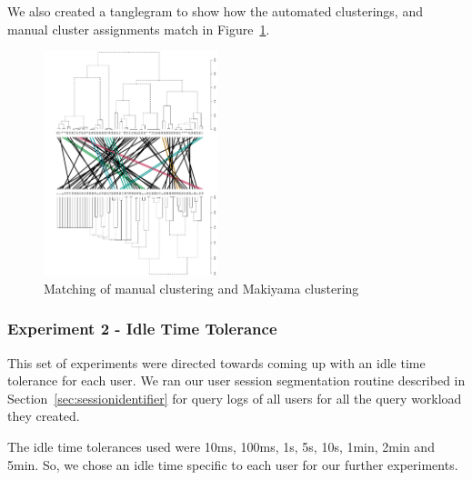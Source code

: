 
We also created a tanglegram to show how the automated clusterings, and manual cluster assignments match in Figure~\ref{fig:tanglegram}.

\begin{figure}[h!]
    \centering
    \includegraphics[width=0.45\textwidth]{graphics/tanglegram}
    \caption{Matching of manual clustering and Makiyama clustering }
    \label{fig:tanglegram}
\end{figure}

\subsubsection{Experiment 2 - Idle Time Tolerance}
This set of experiments were directed towards coming up with an idle time tolerance for each user.
We ran our user session segmentation routine described in Section~\ref{sec:sessionidentifier} for query logs of all users for all the query workload they created.

The idle time tolerances used were 10ms, 100ms, 1s, 5s, 10s, 1min, 2min and 5min.
So, we chose an idle time specific to each user for our further experiments.


